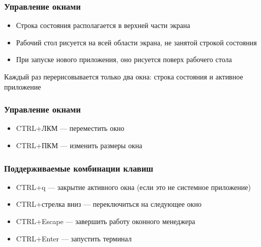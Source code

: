 \begin{frame}
\frametitle{Управление окнами}

\begin{itemize}
\item Строка состояния располагается в верхней части экрана
\item Рабочий стол рисуется на всей области экрана, не занятой строкой состояния
\item При запуске нового приложения, оно рисуется поверх рабочего стола
\end{itemize}

\begin{block}{}
\centering
Каждый раз перерисовывается только два окна: строка состояния и активное приложение
\end{block}

\end{frame}


\begin{frame}
\frametitle{Управление окнами}

\begin{itemize}
\item CTRL+ЛКМ --- переместить окно
\item CTRL+ПКМ --- изменить размеры окна
\end{itemize}

\end{frame}


\begin{frame}
\frametitle{Поддерживаемые комбинации клавиш}

\begin{itemize}
\item CTRL+q --- закрытие активного окна (если это не системное приложение)
\item CTRL+стрелка вниз --- переключиться на следующее окно
\item CTRL+Escape --- завершить работу оконного менеджера
\item CTRL+Enter --- запустить терминал
\end{itemize}

\end{frame}

